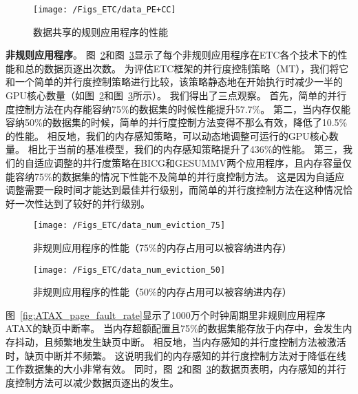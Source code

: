 \begin{figure}[htbp] %
  \centering
  \texttt{[image: /Figs\_ETC/data\_PE+CC]}
  \caption{数据共享的规则应用程序的性能}
  \label{fig:data_PE+CC}
\end{figure}


\textbf{非规则应用程序}。
图~\ref{fig:data_num_eviction_75}和图~\ref{fig:data_num_eviction_50}显示了每个非规则应用程序在ETC各个技术下的性能和总的数据页逐出次数。
为评估ETC框架的并行度控制策略（MT），我们将它和一个简单的并行度控制策略进行比较，该策略静态地在开始执行时减少一半的GPU核心数量（如图~\ref{fig:data_num_eviction_75}和图~\ref{fig:data_num_eviction_50}所示）。
我们得出了三点观察。
首先，简单的并行度控制方法在内存能容纳75\%的数据集的时候性能提升57.7\%。
第二，当内存仅能容纳50\%的数据集的时候，简单的并行度控制方法变得不那么有效，降低了10.5\%的性能。
相反地，我们的内存感知策略，可以动态地调整可运行的GPU核心数量。
相比于当前的基准模型，我们的内存感知策略提升了436\%的性能。
第三，我们的自适应调整的并行度策略在BICG和GESUMMV两个应用程序，且内存容量仅能容纳75\%的数据集的情况下性能不及简单的并行度控制方法。
这是因为自适应调整需要一段时间才能达到最佳并行级别，而简单的并行度控制方法在这种情况恰好一次性达到了较好的并行级别。



\begin{figure}[htbp] %
  \centering
  \texttt{[image: /Figs\_ETC/data\_num\_eviction\_75]}
  \caption{非规则应用程序的性能（75\%的内存占用可以被容纳进内存）}
  \label{fig:data_num_eviction_75}
\end{figure}

\begin{figure}[htbp] %
  \centering
  \texttt{[image: /Figs\_ETC/data\_num\_eviction\_50]}
  \caption{非规则应用程序的性能（50\%的内存占用可以被容纳进内存）}
  \label{fig:data_num_eviction_50}
\end{figure}

图~\ref{fig:ATAX_page_fault_rate}显示了1000万个时钟周期里非规则应用程序ATAX的缺页中断率。
当内存超额配置且75\%的数据集能存放于内存中，会发生内存抖动，且频繁地发生缺页中断。
相反地，当内存感知的并行度控制方法被激活时，缺页中断并不频繁。
这说明我们的内存感知的并行度控制方法对于降低在线工作数据集的大小非常有效。
同时，图~\ref{fig:data_num_eviction_75}和图~\ref{fig:data_num_eviction_50}的数据页表明，内存感知的并行度控制方法可以减少数据页逐出的发生。


